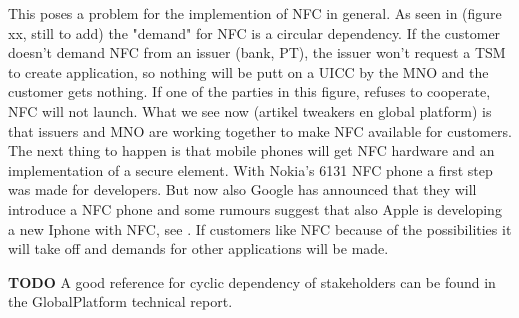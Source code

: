 This poses a problem for the implemention of NFC in general.
As seen in (figure xx, still to add) the "demand" for NFC is a circular dependency.
If the customer doesn't demand NFC from an issuer (bank, PT), the issuer won't request a TSM to create application, so nothing will be putt on a UICC by the MNO and the customer gets nothing.
If one of the parties in this figure, refuses to cooperate, NFC will not launch.
What we see now (artikel tweakers en global platform) is that issuers and MNO are working together to make NFC available for customers.
The next thing to happen is that mobile phones will get NFC hardware and an implementation of a secure element.
With Nokia's 6131 NFC phone a first step was made for developers.
But now also Google has announced that they will introduce a NFC phone and some rumours suggest that also Apple is developing a new Iphone with NFC, see \cite{nu_artikel}.
If customers like NFC because of the possibilities it will take off and demands for other applications will be made. 

\textbf{TODO} A good reference for cyclic dependency of stakeholders can be found in the GlobalPlatform technical report.









